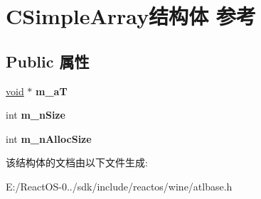 \hypertarget{struct_c_simple_array}{}\section{C\+Simple\+Array结构体 参考}
\label{struct_c_simple_array}
\subsection*{Public 属性}
\begin{DoxyCompactItemize}
\item 
\mbox{\label{struct_c_simple_array_a1551b88e814c769ae5b54bcf6f5079a0}} 
\hyperlink{interfacevoid}{void} $\ast$ {\bfseries m\+\_\+aT}
\item 
\mbox{\label{struct_c_simple_array_ad21947f54c9e4b96f54025dcf6ee032c}} 
int {\bfseries m\+\_\+n\+Size}
\item 
\mbox{\label{struct_c_simple_array_ad8c28c37d1394fec79776e5e3cef781d}} 
int {\bfseries m\+\_\+n\+Alloc\+Size}
\end{DoxyCompactItemize}


该结构体的文档由以下文件生成\+:\begin{DoxyCompactItemize}
\item 
E\+:/\+React\+O\+S-\/0../sdk/include/reactos/wine/atlbase.\+h\end{DoxyCompactItemize}
